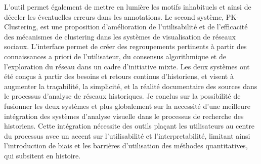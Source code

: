 {L’outil permet également de mettre en lumière les motifs inhabituels et ainsi de déceler les éventuelles erreurs dans les annotations.
Le second système, PK-Clustering, est une proposition d'amélioration de l'utilisabilité et de l'efficacité des mécanismes de clustering dans les systèmes de visualisation de réseaux sociaux.
L'interface permet de créer des regroupements pertinents à partir des connaissances a priori de l'utilisateur, du consensus algorithmique et de l'exploration du réseau dans un cadre d'initiative mixte.
Les deux systèmes ont été conçus à partir des besoins et retours continus d'historiens, et visent à augmenter la traçabilité, la simplicité, et la réalité documentaire des sources dans le processus d'analyse de réseaux historiques.
Je conclus sur la possibilité de fusionner les deux systèmes et plus globalement sur la necessité d'une meilleure intégration des systèmes d'analyse visuelle dans le processus de recherche des historiens.
Cette intégration nécessite des outils plaçant les utilisateurs au centre du processus avec un accent sur l'utilisabilité et l'interpretabilité, limitant ainsi l'introduction de biais et les barrières d'utilisation des méthodes quantitatives, qui subsitent en histoire.}




